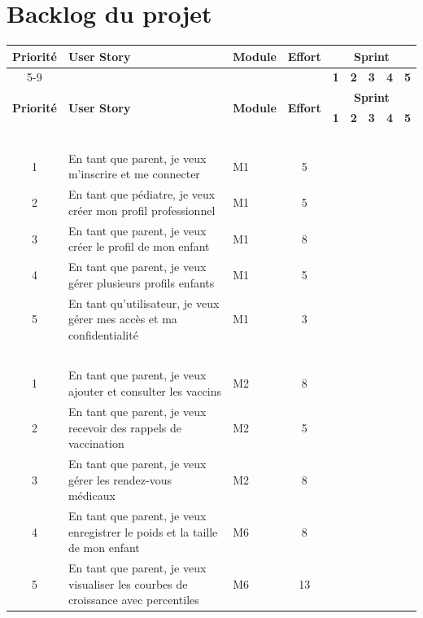 \documentclass[11pt,a4paper]{article}
\begin{document}
\section{Backlog du projet}

\renewcommand{\arraystretch}{1.3}
\small
\begin{longtable}{|c|p{5.5cm}|p{2cm}|c|c|c|c|c|c|}
\hline
\multirow{2}{*}{\cellcolor{white}\textbf{Priorité}} &
\multirow{2}{*}{\cellcolor{white}\textbf{User Story}} &
\multirow{2}{*}{\cellcolor{white}\textbf{Module}} &
\multirow{2}{*}{\cellcolor{white}\textbf{Effort}} &
\multicolumn{5}{c|}{\cellcolor{headgrey}\textbf{Sprint}} \\
\cline{5-9}
& & & & \textbf{1} & \textbf{2} & \textbf{3} & \textbf{4} & \textbf{5} \\
\hline
\endfirsthead
\hline
\multirow{2}{*}{\cellcolor{white}\textbf{Priorité}} &
\multirow{2}{*}{\cellcolor{white}\textbf{User Story}} &
\multirow{2}{*}{\cellcolor{white}\textbf{Module}} &
\multirow{2}{*}{\cellcolor{white}\textbf{Effort}} &
\multicolumn{5}{c|}{\cellcolor{headgrey}\textbf{Sprint}} \\
\cline{5-9}
& & & & \textbf{1} & \textbf{2} & \textbf{3} & \textbf{4} & \textbf{5} \\
\hline
\endhead

\multicolumn{9}{|l|}{\cellcolor{phasebg}\textcolor{white}{\textbf{Phase 1 -- Authentification \& Profil}}} \\
\hline
1 & En tant que parent, je veux m'inscrire et me connecter & M1 & 5 & & & & & \\
\hline
2 & En tant que pédiatre, je veux créer mon profil professionnel & M1 & 5 & & & & & \\
\hline
3 & En tant que parent, je veux créer le profil de mon enfant & M1 & 8 & & & & & \\
\hline
4 & En tant que parent, je veux gérer plusieurs profils enfants & M1 & 5 & & & & & \\
\hline
5 & En tant qu'utilisateur, je veux gérer mes accès et ma confidentialité & M1 & 3 & & & & & \\
\hline

\multicolumn{9}{|l|}{\cellcolor{phasebg}\textcolor{white}{\textbf{Phase 2 -- Vaccination, RDV \& Croissance}}} \\
\hline
1 & En tant que parent, je veux ajouter et consulter les vaccins & M2 & 8 & & & & & \\
\hline
2 & En tant que parent, je veux recevoir des rappels de vaccination & M2 & 5 & & & & & \\
\hline
3 & En tant que parent, je veux gérer les rendez-vous médicaux & M2 & 8 & & & & & \\
\hline
4 & En tant que parent, je veux enregistrer le poids et la taille de mon enfant & M6 & 8 & & & & & \\
\hline
5 & En tant que parent, je veux visualiser les courbes de croissance avec percentiles & M6 & 13 & & & & & \\
\hline


\end{longtable}
\end{document}
